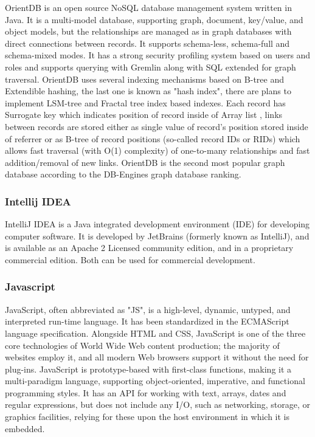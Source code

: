 \documentclass[12pt]{article}
\begin{document}
OrientDB is an open source NoSQL database management system written in Java. It is a multi-model database, supporting graph, document, key/value, and object models, but the relationships are managed as in graph databases with direct connections between records. It supports schema-less, schema-full and schema-mixed modes. It has a strong security profiling system based on users and roles and supports querying with Gremlin along with SQL extended for graph traversal. OrientDB uses several indexing mechanisms based on B-tree and Extendible hashing, the last one is known as "hash index", there are plans to implement LSM-tree and Fractal tree index based indexes. Each record has Surrogate key which indicates position of record inside of Array list , links between records are stored either as single value of record's position stored inside of referrer or as B-tree of record positions (so-called record IDs or RIDs) which allows fast traversal (with O(1) complexity) of one-to-many relationships and fast addition/removal of new links. OrientDB is the second most popular graph database according to the DB-Engines graph database ranking.

\newpage
\subsubsection{Intellij IDEA }

IntelliJ IDEA  is a Java integrated development environment (IDE) for developing computer software. It is developed by JetBrains (formerly known as IntelliJ), and is available as an Apache 2 Licensed community edition, and in a proprietary commercial edition. Both can be used for commercial development.

\newpage
\subsubsection{Javascript }

JavaScript, often abbreviated as "JS", is a high-level, dynamic, untyped, and interpreted run-time language. It has been standardized in the ECMAScript language specification. Alongside HTML and CSS, JavaScript is one of the three core technologies of World Wide Web content production; the majority of websites employ it, and all modern Web browsers support it without the need for plug-ins. JavaScript is prototype-based with first-class functions, making it a multi-paradigm language, supporting object-oriented, imperative, and functional programming styles. It has an API for working with text, arrays, dates and regular expressions, but does not include any I/O, such as networking, storage, or graphics facilities, relying for these upon the host environment in which it is embedded.
\end{document}
